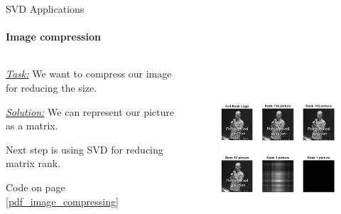 \documentclass[aspectratio=169]{beamer}
\begin{document}
\begin{frame}[t, label=image_compression]{SVD Applications}
\framesubtitle{Image compression}
\begin{columns}[T,onlytextwidth]
    \begin{column}{0.39\textwidth}
        \textit{\underline{Task:}} We want to compress our image for reducing the size.

\textit{\underline{Solution:}} We can represent our picture as a matrix. 

Next step is using SVD for reducing matrix rank.

Code on page \ref{pdf_image_compressing}

    \end{column}
    \begin{column}{0.59\textwidth}
        \vspace{-1cm}
        \begin{figure}[H]
            \centering\includegraphics[height=6cm,width=1\textwidth,keepaspectratio]{image_proc.png}
            \label{fig:image_proc.png}
        \end{figure}
    \end{column}
\end{columns}
    
\end{frame}
\end{document}
